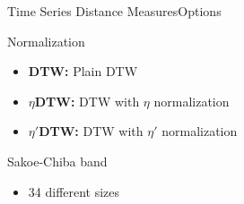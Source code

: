 \begin{frame}{Time Series Distance Measures}{Options}
    \begin{block}{Normalization}
        \begin{itemize}
            \item \textbf{DTW:} Plain DTW
            \pause
            \item \textbf{$\eta$DTW:} DTW with $\eta$ normalization
            \pause
            \item \textbf{$\eta '$DTW:} DTW with $\eta '$ normalization
            \pause
        \end{itemize}
    \end{block}
    \begin{block}{Sakoe-Chiba band}
        \begin{itemize}
            \item 34 different sizes
        \end{itemize}
    \end{block}
\end{frame}
